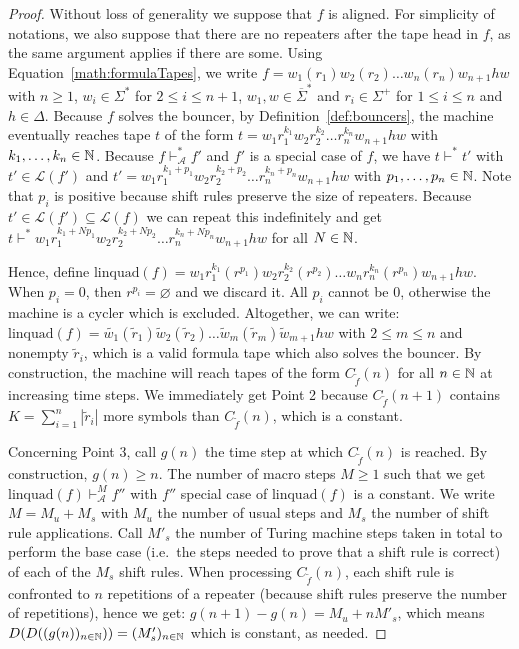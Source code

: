 \begin{proof}
    Without loss of generality we suppose that $f$ is aligned. For simplicity of notations, we also suppose that there are no repeaters after the tape head in $f$, as the same argument applies if there are some. Using Equation~\eqref{math:formulaTapes}, we write $f=w_1(r_1)w_2(r_2)\dots w_n(r_n) w_{n+1} h w$ with $n \geq 1$, $w_i \in \Sigma^*$ for $2 \leq i \leq n+1$, $w_1,w \in \overline{\Sigma}^*$ and $r_i \in \Sigma^+$ for $1 \leq i \leq n$ and $h\in\Delta$.
    Because $f$ solves the bouncer, by Definition~\ref{def:bouncers}, the machine eventually reaches tape $t$ of the form $t = w_1 r_1^{k_1} w_2 r_2^{k_2} \dots r_n^{k_n} w_{n+1} h w$ with $k_1, \dots, k_n \in \mathbb{N}$. Because $f \vdash_\mathcal{A}^* f'$ and $f'$ is a special case of $f$, we have $t \vdash^* t'$ with $t' \in \mathcal{L}(f')$ and $t' = w_1 r_1^{k_1 + p_1} w_2 r_2^{k_2 + p_2} \dots r_n^{k_n + p_n} w_{n+1} h w$ with $p_1, \dots, p_n \in \mathbb{N}$. Note that $p_i$ is positive because shift rules preserve the size of repeaters. Because $t'\in\mathcal{L}(f') \subseteq \mathcal{L}(f)$ we can repeat this indefinitely and get $t \vdash^* w_1 r_1^{k_1 + Np_1} w_2 r_2^{k_2 + Np_2} \dots r_n^{k_n + Np_n} w_{n+1} h w$ for all $N \in \mathbb{N}$.

    Hence, define $\text{linquad}(f) = w_1 r_1^{k_1} (r^{p_1}) w_2 r_2^{k_2} (r^{p_2}) \dots w_n r_n^{k_n} (r^{p_n}) w_{n+1} h w$. When $p_i=0$, then $r^{p_i} = \varnothing$ and we discard it. All $p_i$ cannot be $0$, otherwise the machine is a cycler which is excluded. Altogether, we can write: $\text{linquad}(f) = \tilde{w_1} (\tilde{r}_1) \tilde{w}_2 (\tilde{r}_2) \dots \tilde{w}_m (\tilde{r}_m) \tilde{w}_{m+1} h w$ with $2 \leq m \leq n$ and nonempty $\tilde{r}_i$, which is a valid formula tape which also solves the bouncer. By construction, the machine will reach tapes of the form $C_{\tilde{f}}(n)$ for all $n\in\mathbb{N}$ at increasing time steps. We immediately get Point 2 because $C_{\tilde{f}}(n+1)$ contains $K = \sum_{i=1}^n |\tilde{r}_i|$ more symbols than $C_{\tilde{f}}(n)$, which is a constant.

    Concerning Point 3, call $g(n)$ the time step at which $C_{\tilde{f}}(n)$ is reached. By construction, $g(n) \geq n$. The number of macro steps $M \geq 1$ such that we get $\text{linquad}(f) \vdash_\mathcal{A}^M f''$ with $f''$ special case of $\text{linquad}(f)$ is a constant. We write $M = M_u + M_s$ with $ M_u$ the number of usual steps and $M_s$ the number of shift rule applications. Call $M'_s$ the number of Turing machine steps taken in total to perform the base case (i.e.\ the steps needed to prove that a shift rule is correct) of each of the $M_s$ shift rules. When processing $C_{\tilde{f}}(n)$, each shift rule is confronted to $n$ repetitions of a repeater (because shift rules preserve the number of repetitions), hence we get: $g(n+1) - g(n) = M_u + n M'_s$, which means $D(D((g(n))_{n\in\mathbb{N}})) = (M'_s)_{n\in\mathbb{N}}$ which is constant, as needed.

\end{proof}

